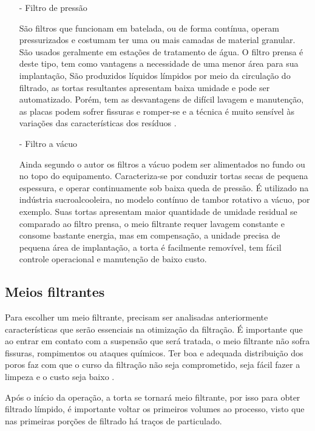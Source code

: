 \begin{enumerate}

\item[-] Filtro de pressão
 
  São filtros que funcionam em batelada, ou de forma contínua, operam
  pressurizados e costumam ter uma ou mais camadas de material granular. São
  usados geralmente em estações de tratamento de água. O filtro prensa é deste
  tipo, tem como vantagens a necessidade de uma menor área para sua implantação,
  São produzidos líquidos límpidos por meio da circulação do filtrado, as tortas
  resultantes apresentam baixa umidade e pode ser automatizado. Porém, tem as
  desvantagens de difícil lavagem e manutenção, as placas podem sofrer fissuras
  e romper-se e a técnica é muito sensível às variações das características dos
  resíduos .


\item[-] Filtro a vácuo

  Ainda segundo o autor os filtros a vácuo podem ser alimentados no fundo ou no topo do equipamento.
  Caracteriza-se por conduzir tortas secas de pequena espessura, e operar
  continuamente sob baixa queda de pressão. É utilizado na indústria
  sucroalcooleira, no modelo contínuo de tambor rotativo a vácuo, por exemplo.
  Suas tortas apresentam maior quantidade de umidade residual se comparado ao
  filtro prensa, o meio filtrante requer lavagem constante e consome bastante
  energia, mas em compensação, a unidade precisa de pequena área de implantação,
  a torta é facilmente removível, tem fácil controle operacional e manutenção de
  baixo custo.


\end{enumerate}


\subsection{Meios filtrantes}
\label{subsec:meiosfiltrantes}

Para escolher um meio filtrante, precisam ser analisadas anteriormente
características que serão essenciais na otimização da filtração. É importante
que ao entrar em contato com a suspensão que será tratada, o meio filtrante não
sofra fissuras, rompimentos ou ataques químicos. Ter boa e adequada distribuição
dos poros faz com que o curso da filtração não seja comprometido, seja fácil
fazer a limpeza e o custo seja baixo .

Após o início da operação, a torta se tornará meio filtrante, por isso para
obter filtrado límpido, é importante voltar os primeiros volumes ao processo,
visto que nas primeiras porções de filtrado há traços de particulado.

